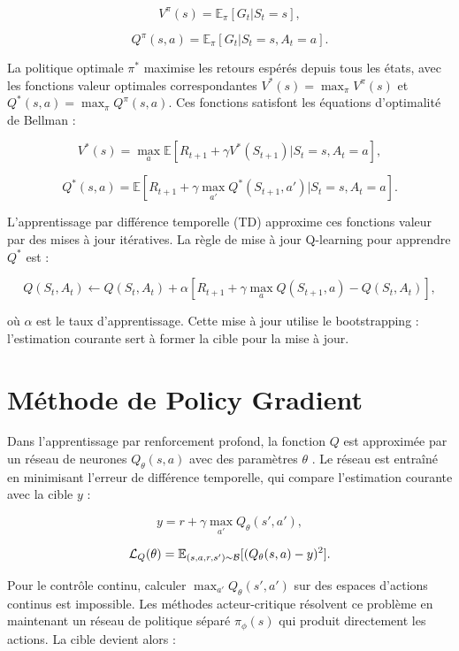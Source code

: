 \documentclass[a4paper, 12pt]{report}
\begin{document}
    $$
    V^\pi (s) = \mathbb{E}_\pi [ G_t | S_t = s],
    $$

    $$
    Q^\pi (s, a) = \mathbb{E}_\pi [ G_t | S_t = s, A_t = a].
    $$

    La politique optimale $\pi^*$ maximise les retours espérés depuis tous les états, avec les fonctions valeur optimales correspondantes $V^* (s) = \max_\pi V^\pi (s)$ et $Q^* (s, a) = \max_\pi Q^\pi (s, a)$. Ces fonctions satisfont les équations d'optimalité de Bellman :

    $$
    V^* (s) = \max_a \mathbb{E} [R_{t+1} + \gamma V^* (S_{t+1}) | S_t = s, A_t = a],
    $$

    $$
    Q^* (s, a) = \mathbb{E} [R_{t+1} + \gamma \max_{a'} Q^* (S_{t+1}, a') | S_t = s, A_t = a].
    $$

    L'apprentissage par différence temporelle (TD) approxime ces fonctions
    valeur par des mises à jour itératives. La règle de
    mise à jour Q-learning pour apprendre $Q^*$ est :

    $$
    Q(S_t, A_t) \leftarrow Q(S_t, A_t) + \alpha [R_{t+1} + \gamma \max_a Q(S_{t+1}, a) - Q(S_t, A_t)],
    $$

    où $\alpha$ est le taux d'apprentissage. Cette mise à jour utilise le
    bootstrapping : l'estimation courante sert à former la cible pour la mise à
    jour.

    \section{Méthode de Policy Gradient}

    Dans l'apprentissage par renforcement profond, la fonction $Q$ est
    approximée par un réseau de neurones $Q_\theta (s, a)$ avec des paramètres
    $\theta$ \cite{sutton1999policygradientmethodsreinforcement}. Le réseau est
    entraîné en minimisant l'erreur de différence temporelle, qui compare
    l'estimation courante avec la cible $y$ :

    $$
    y = r + \gamma \max_{a'} Q_\theta (s', a'),
    $$

    $$
    {\cal{L}}_Q (\theta) = \mathbb{E}_{(s,a,r,s') \sim \cal{B}} [(Q_\theta (s, a) - y)^2 ].
    $$

    Pour le contrôle continu, calculer $\max_{a'} Q_\theta (s', a')$ sur des
    espaces d'actions continus est impossible. Les méthodes acteur-critique
    résolvent ce problème en maintenant un réseau de politique séparé $\pi_\phi
    (s)$ qui produit directement les actions. La cible devient alors :
\end{document}
